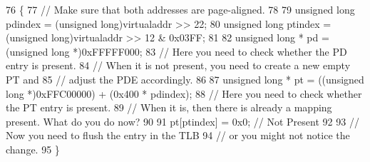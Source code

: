 \begin{DoxyCode}
76 \{
77     \textcolor{comment}{// Make sure that both addresses are page-aligned.}
78  
79     \textcolor{keywordtype}{unsigned} \textcolor{keywordtype}{long} pdindex = (\textcolor{keywordtype}{unsigned} long)virtualaddr >> 22;
80     \textcolor{keywordtype}{unsigned} \textcolor{keywordtype}{long} ptindex = (\textcolor{keywordtype}{unsigned} long)virtualaddr >> 12 & 0x03FF;
81  
82     \textcolor{keywordtype}{unsigned} \textcolor{keywordtype}{long} * pd = (\textcolor{keywordtype}{unsigned} \textcolor{keywordtype}{long} *)0xFFFFF000;
83     \textcolor{comment}{// Here you need to check whether the PD entry is present.}
84     \textcolor{comment}{// When it is not present, you need to create a new empty PT and}
85     \textcolor{comment}{// adjust the PDE accordingly.}
86  
87     \textcolor{keywordtype}{unsigned} \textcolor{keywordtype}{long} * pt = ((\textcolor{keywordtype}{unsigned} \textcolor{keywordtype}{long} *)0xFFC00000) + (0x400 * pdindex);
88     \textcolor{comment}{// Here you need to check whether the PT entry is present.}
89     \textcolor{comment}{// When it is, then there is already a mapping present. What do you do now?}
90  
91     pt[ptindex] = 0x0; \textcolor{comment}{// Not Present}
92  
93     \textcolor{comment}{// Now you need to flush the entry in the TLB}
94     \textcolor{comment}{// or you might not notice the change.}
95 \}
\end{DoxyCode}
